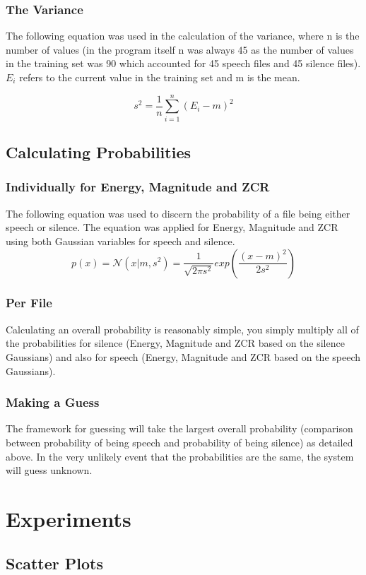 \documentclass[12pt]{article} %
\begin{document}
\subsubsection{The Variance}
The following equation was used in the calculation of the variance, where n is the number of values
(in the program itself n was always 45 as the number of values in the training set was 90 which
accounted for 45 speech files and 45 silence files). $E_i$ refers to the current value in the
training set and m is the mean. 

\[
s^2= \frac{1}{n} \sum_{i=1}^{n} (E_i - m)^2
\]
\subsection{Calculating Probabilities}
\label{Probabilities}
\subsubsection{Individually for Energy, Magnitude and ZCR}
The following equation was used to discern the probability of a file being either speech or
silence. The equation was applied for Energy, Magnitude and ZCR using both Gaussian
variables for speech and silence. 
\[
p(x) = \mathcal{N} (x|m,s^2) = \frac{1}{\sqrt{2\pi s^2}} exp \left(\frac{(x - m)^2}{2s^2} \right)
\]
\subsubsection{Per File}
Calculating an overall probability is reasonably simple, you simply multiply all of the
probabilities for silence (Energy, Magnitude and ZCR based on the silence Gaussians) and also for
speech (Energy, Magnitude and ZCR based on the speech Gaussians).

\subsubsection{Making a Guess}
The framework for guessing will take the largest overall probability (comparison between
probability of being speech and probability of being silence) as detailed above. In the very
unlikely event that the probabilities are the same, the system will guess unknown.

\newpage
\section{Experiments}
\label{sec:Experiments}

\subsection{Scatter Plots}
\end{document}
